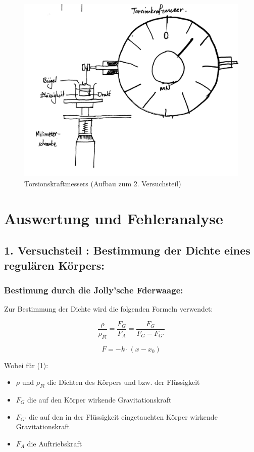 \documentclass[11pt,a4paper]{article} %
\begin{document}
\begin{figure}
	
	\includegraphics[scale=0.15]{Abb2}
	\caption{ Torsionskraftmessers 
		 (Aufbau zum 2. Versuchsteil)
	              }
\end{figure}
\newpage


\section{Auswertung und Fehleranalyse}

\subsection{1. Versuchsteil : Bestimmung der Dichte eines regulären Körpers:}
\subsubsection{Bestimung durch die Jolly'sche Fderwaage:}
Zur Bestimmung der Dichte wird die folgenden Formeln verwendet:

\begin{equation}
\frac{\rho}{\rho_{Fl}} = \frac{F_{G}}{F_{A}} = \frac{F_G}{F_G - F_{G'}}
\end{equation}

\begin{equation}
F = -k\cdot(x-x_0)
\end{equation}

Wobei für (1):
\begin{itemize}
	\item $\rho$ und $\rho_{Fl}$ die Dichten des Körpers und bzw. der Flüssigkeit 
	\item $F_G$ die auf den Körper wirkende Gravitationskraft
	\item $F_{G'}$ die auf den in der Flüssigkeit eingetauchten Körper wirkende Gravitationskraft
	\item $F_A$ die Auftriebskraft
\end{itemize}
\end{document}
